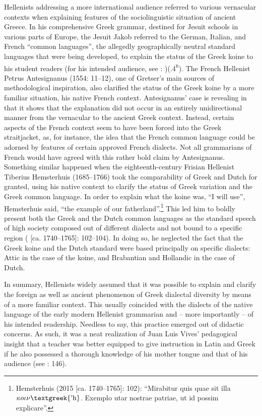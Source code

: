Hellenists addressing a more international audience referred to various vernacular contexts when explaining features of the sociolinguistic situation of ancient Greece. In his comprehensive Greek grammar, destined for Jesuit schools in various parts of Europe, the Jesuit Jakob \citet[20]{Gretser1593} referred to the German, Italian, and French “common languages”, the allegedly geographically neutral standard languages that were being developed, to explain the status of the Greek koine to his student readers (for his intended audience, see \citealt{Gretser1593}: )(.4\textsc{\textsuperscript{r}}). The French Hellenist Petrus Antesignanus (1554: 11–12), one of Gretser’s main sources of methodological inspiration, also clarified the status of the Greek koine by a more familiar situation, his native French context. Antesignanus’ case is revealing in that it shows that the explanation did not occur in an entirely unidirectional manner from the vernacular to the ancient Greek context. Instead, certain aspects of the French context seem to have been forced into the Greek straitjacket, as, for instance, the idea that the French common language could be adorned by features of certain approved French dialects. Not all grammarians of French would have agreed with this rather bold claim by Antesignanus. Something similar happened when the eighteenth-century Frisian Hellenist Tiberius Hemsterhuis (1685–1766) took the comparability of Greek and Dutch for granted, using his native context to clarify the status of Greek variation and the Greek common language. In order to explain what the koine was, “I will use”, Hemsterhuis said, “the example of our fatherland”.\footnote{Hemsterhuis (2015 [ca. 1740–1765]: 102): “Mirabitur quis quae sit illa $\kappa o\iota \nu \text{\textgreek{'h}}$. Exemplo utar nostrae patriae, ut id possim explicare”.} This led him to boldly present both the Greek and the Dutch common languages as the standard speech of high society composed out of different dialects and not bound to a specific region (\citealt{Hemsterhuis2015} [ca. 1740–1765]: 102–104). In doing so, he neglected the fact that the Greek koine and the Dutch standard were based principally on specific dialects: Attic in the case of the koine, and Brabantian and Hollandic in the case of Dutch.

In summary, Hellenists widely assumed that it was possible to explain and clarify the foreign as well as ancient phenomenon of Greek dialectal diversity by means of a more familiar context. This usually coincided with the dialects of the native language of the early modern Hellenist grammarian and – more importantly – of his intended readership. Needless to say, this practice emerged out of didactic concerns. As such, it was a neat realization of Juan Luis Vives’ pedagogical insight that a teacher was better equipped to give instruction in Latin and Greek if he also possessed a thorough knowledge of his mother tongue and that of his audience (see \citealt{Padley1985}: 146).

